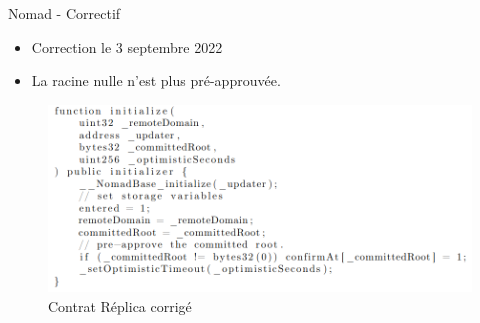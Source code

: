\begin{frame}{Nomad - Correctif}
    \begin{itemize}
        \item Correction le 3 septembre 2022
        \item La racine nulle n'est plus pré-approuvée.
    \end{itemize}
    \begin{figure}
        \centering
        \includegraphics[scale = 0.35]{centralisation/img/nomad/nomad_code_fixed.png}
        \caption{Contrat Réplica corrigé}
    \end{figure}
\end{frame}